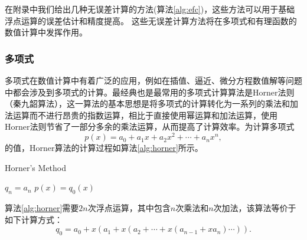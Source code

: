 \documentclass[a4paper,10pt]{ctexart}
\begin{document}
在附录中我们给出几种无误差计算的方法(算法\ref{alg:efc})，这些方法可以用于基础浮点运算的误差估计和精度提高。
这些无误差计算方法将在多项式和有理函数的数值计算中发挥作用。

\subsubsection{多项式}
多项式在数值计算中有着广泛的应用，例如在插值、逼近、微分方程数值解等问题中都会涉及到多项式的计算。最经典也是最常用的多项式计算算法是Horner法则（秦九韶算法），这一算法的基本思想是将多项式的计算转化为一系列的乘法和加法运算而不进行昂贵的指数运算，相比于直接使用幂运算和加法运算，使用Horner法则节省了一部分多余的乘法运算，从而提高了计算效率。为计算多项式
\[
    p(x) = a_0 + a_1x + a_2x^2 + \cdots + a_nx^n,
\]
的值，Horner算法的计算过程如算法\ref{alg:horner}所示。
\begin{algorithm}
    \caption{Horner's Method}\label{alg:horner}
    $ q_n = a_n $\;
    \Return $ p(x) = q_0(x) $\;
\end{algorithm}

算法\ref{alg:horner}需要$ 2n $次浮点运算，其中包含$ n $次乘法和$ n $次加法，该算法等价于如下计算方式：
\[
    q_0 = a_0 + x(a_1 + x(a_2 + \cdots + x(a_{n-1} + x a_n)\cdots)).
\]
\end{document}
